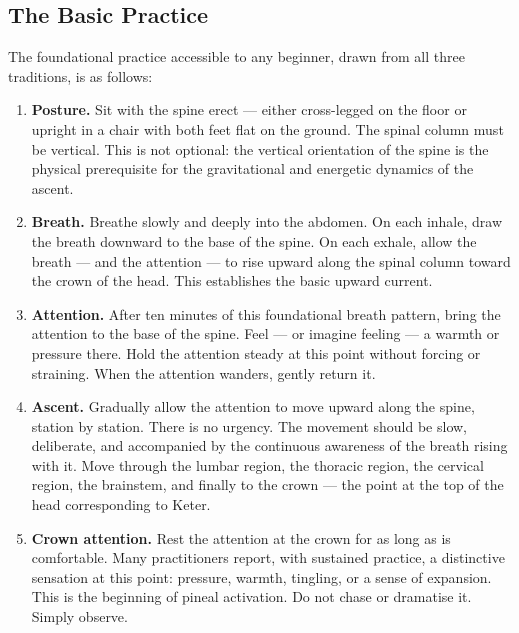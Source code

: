 \documentclass[12pt, a4paper]{article}
\begin{document}
\subsection{The Basic Practice}

The foundational practice accessible to any beginner, drawn from all three
traditions, is as follows:

\begin{enumerate}[leftmargin=1.5cm, label=\textbf{\arabic*.}]
  \item \textbf{Posture.} Sit with the spine erect — either cross-legged on
  the floor or upright in a chair with both feet flat on the ground. The
  spinal column must be vertical. This is not optional: the vertical
  orientation of the spine is the physical prerequisite for the gravitational
  and energetic dynamics of the ascent.

  \item \textbf{Breath.} Breathe slowly and deeply into the abdomen. On each
  inhale, draw the breath downward to the base of the spine. On each exhale,
  allow the breath — and the attention — to rise upward along the spinal
  column toward the crown of the head. This establishes the basic upward
  current.

  \item \textbf{Attention.} After ten minutes of this foundational breath
  pattern, bring the attention to the base of the spine. Feel — or imagine
  feeling — a warmth or pressure there. Hold the attention steady at this
  point without forcing or straining. When the attention wanders, gently
  return it.

  \item \textbf{Ascent.} Gradually allow the attention to move upward along
  the spine, station by station. There is no urgency. The movement should be
  slow, deliberate, and accompanied by the continuous awareness of the breath
  rising with it. Move through the lumbar region, the thoracic region, the
  cervical region, the brainstem, and finally to the crown — the point at
  the top of the head corresponding to Keter.

  \item \textbf{Crown attention.} Rest the attention at the crown for as long
  as is comfortable. Many practitioners report, with sustained practice, a
  distinctive sensation at this point: pressure, warmth, tingling, or a
  sense of expansion. This is the beginning of pineal activation. Do not
  chase or dramatise it. Simply observe.
\end{enumerate}
\end{document}
